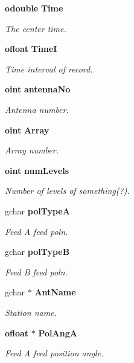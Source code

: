 \begin{CompactItemize}
{\bf odouble} {\bf Time}
\begin{CompactList}\small\item\em The center time. \item\end{CompactList}\item 
{\bf ofloat} {\bf Time\-I}
\begin{CompactList}\small\item\em Time interval of record. \item\end{CompactList}\item 
{\bf oint} {\bf antenna\-No}
\begin{CompactList}\small\item\em Antenna number. \item\end{CompactList}\item 
{\bf oint} {\bf Array}
\begin{CompactList}\small\item\em Array number. \item\end{CompactList}\item 
{\bf oint} {\bf num\-Levels}
\begin{CompactList}\small\item\em Number of levels of something(?). \item\end{CompactList}\item 
gchar {\bf pol\-Type\-A}
\begin{CompactList}\small\item\em Feed A feed poln. \item\end{CompactList}\item 
gchar {\bf pol\-Type\-B}
\begin{CompactList}\small\item\em Feed B feed poln. \item\end{CompactList}\item 
gchar $\ast$ {\bf Ant\-Name}
\begin{CompactList}\small\item\em Station name. \item\end{CompactList}\item 
{\bf ofloat} $\ast$ {\bf Pol\-Ang\-A}
\begin{CompactList}\small\item\em Feed A feed position angle. \item\end{CompactList}\item 

\end{CompactItemize}

